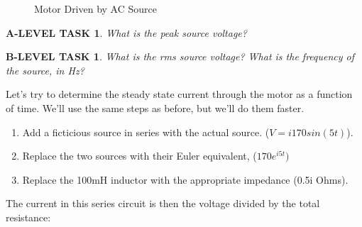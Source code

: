 \documentclass{book}
\numberwithin{equation}{section}
\newtheorem{alevel}{A-LEVEL TASK}
\newtheorem{blevel}{B-LEVEL TASK}
\theoremstyle{definition}
\begin{document}
\par
\begin{figure}[H]
\begin{center}
\caption{Motor Driven by AC Source}
\label{F:8MOTOR}
\end{center}
\end{figure}

\begin{alevel}
What is the peak source voltage?
\end{alevel}

\begin{blevel}
What is the rms source voltage? What is the frequency of the source, in Hz?
\end{blevel}

Let's try to determine the steady state current through the motor as a function of time. We'll use the same steps as before, but we'll do them faster. 
\begin{enumerate}
\item Add a ficticious source in series with the actual source. ($V=i170sin(5t)$).
\item Replace the two sources with their Euler equivalent, ($170e^{i5t})$
\item Replace the 100mH inductor with the appropriate impedance (0.5i Ohms).\par
\end{enumerate}

The current in this series circuit is then the voltage divided by the total resistance:
\end{document}
